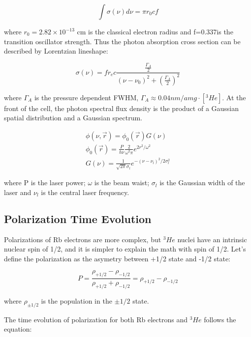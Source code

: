 \begin{equation}
\int\sigma(\nu)d\nu=\pi r_{0}cf
\end{equation}

where $r_{0}=2.82 \times 10^{-13}$ cm is the classical electron radius and f=0.337is the transition oscillator strength. Thus the photon absorption cross section can be described by Lorentzian lineshape:

\begin{equation}
\sigma(\nu)=fr_{e}c\frac{\frac{\Gamma_{A}}{2}}{(\nu-\nu_{0})^{2}+(\frac{\Gamma_{A}}{2})^{2}}
\end{equation}

where $\Gamma_{A}$ is the pressure dependent FWHM, $\Gamma_{A}\approx 0.04nm/amg \cdot [^{3}He]$. At the front of the cell, the photon spectral flux density is the product of a Gaussian spatial distribution and a Gaussian spectrum.

\begin{subequations}
	\begin{gather}
	\phi(\nu,\vec{r})=\phi_{0}(\vec{r})G(\nu) \\
	\phi_{0}(\vec{r})=\frac{P}{h\nu}\frac{2}{\omega^{2}\pi}e^{2r^{2}/\omega^{2}}\\
	G(\nu)=\frac{1}{\sqrt{2\pi}\sigma_{l}}e^{-(\nu-\nu_{l})^2/2\sigma_{l}^{2}}
	\end{gather}
\end{subequations}

where P is the laser power; $\omega$ is the beam waist;  $\sigma_{l}$ is the Gaussian width of the laser and $\nu_{l}$ is the central laser frequency.

\subsection{Polarization Time Evolution}

Polarizations of Rb electrons are more complex, but $^{3}He$ nuclei have an intrinsic nuclear spin of 1/2, and it is simpler to explain the math with spin of 1/2. Let's define the polarization as the asymetry between +1/2 state and -1/2 state:

\begin{equation}
P=\frac{\rho_{+1/2}-\rho_{-1/2}}{\rho_{+1/2}+\rho_{-1/2}}=\rho_{+1/2}-\rho_{-1/2}
\end{equation}

where $\rho_{\pm 1/2}$ is the population in the $\pm1/2$ state.

The time evolution of polarization for both Rb electrons and $^{3}He$ follows the equation:

